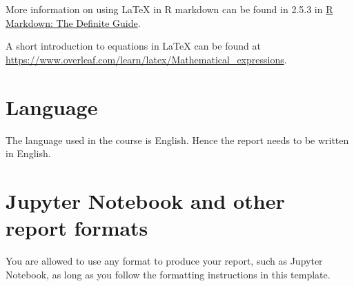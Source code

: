 \documentclass[
]{article}
\begin{document}
More information on using LaTeX in R markdown can be found in 2.5.3 in
\href{https://bookdown.org/yihui/rmarkdown/}{R Markdown: The Definite
Guide}.

A short introduction to equations in LaTeX can be found at
\url{https://www.overleaf.com/learn/latex/Mathematical_expressions}.

\hypertarget{language}{%
\section{Language}\label{language}}

The language used in the course is English. Hence the report needs to be
written in English.

\hypertarget{jupyter-notebook-and-other-report-formats}{%
\section{Jupyter Notebook and other report
formats}\label{jupyter-notebook-and-other-report-formats}}

You are allowed to use any format to produce your report, such as
Jupyter Notebook, as long as you follow the formatting instructions in
this template.
\end{document}
